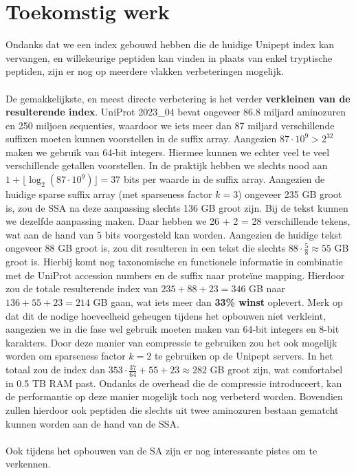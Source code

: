 \section{Toekomstig werk}
Ondanks dat we een index gebouwd hebben die de huidige Unipept index kan vervangen, en willekeurige peptiden kan vinden in plaats van enkel tryptische peptiden, zijn er nog op meerdere vlakken verbeteringen mogelijk.
\\ \\
De gemakkelijkste, en meest directe verbetering is het verder \textbf{verkleinen van de resulterende index}.
UniProt 2023\_04 bevat ongeveer 86.8 miljard aminozuren en 250 miljoen sequenties, waardoor we iets meer dan 87 miljard verschillende suffixen moeten kunnen voorstellen in de suffix array.
Aangezien $87 \cdot 10^9 > 2^{32}$ maken we gebruik van 64-bit integers.
Hiermee kunnen we echter veel te veel verschillende getallen voorstellen.
In de praktijk hebben we slechts nood aan $1 + \lfloor \log_2(87 \cdot 10^9) \rfloor = 37$ bits per waarde in de suffix array.
Aangezien de huidige sparse suffix array (met sparseness factor $k = 3$) ongeveer 235 GB groot is, zou de SSA na deze aanpassing slechts 136 GB groot zijn.
Bij de tekst kunnen we dezelfde aanpassing maken.
Daar hebben we 26 + 2 = 28 verschillende tekens, wat aan de hand van 5 bits voorgesteld kan worden.
Aangezien de huidige tekst ongeveer 88 GB groot is, zou dit resulteren in een tekst die slechts $88 \cdot \frac{5}{8} \approx 55$ GB groot is.
Hierbij komt nog taxonomische en functionele informatie in combinatie met de UniProt accession numbers en de suffix naar proteïne mapping.
Hierdoor zou de totale resulterende index van $235 + 88 + 23 = 346$ GB naar $136 + 55 + 23 = 214$ GB gaan, wat iets meer dan \textbf{33\% winst} oplevert.
Merk op dat dit de nodige hoeveelheid geheugen tijdens het opbouwen niet verkleint, aangezien we in die fase wel gebruik moeten maken van 64-bit integers en 8-bit karakters.
Door deze manier van compressie te gebruiken zou het ook mogelijk worden om sparseness factor $k = 2$ te gebruiken op de Unipept servers.
In het totaal zou de index dan $353 \cdot \frac{37}{64} + 55 + 23 \approx 282$ GB groot zijn, wat comfortabel in 0.5 TB RAM past.
Ondanks de overhead die de compressie introduceert, kan de performantie op deze manier mogelijk toch nog verbeterd worden.
Bovendien zullen hierdoor ook peptiden die slechts uit twee aminozuren bestaan gematcht kunnen worden aan de hand van de SSA\@.
\\ \\
Ook tijdens het opbouwen van de SA zijn er nog interessante pistes om te verkennen.
